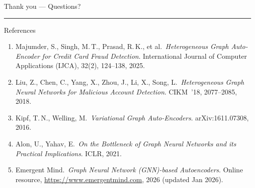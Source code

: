 \documentclass[10pt,aspectratio=169]{beamer}
\begin{document}
\begin{frame}[standout]
  \huge{Thank you --- Questions?}

  \vspace{0.8cm}
  \rule{\linewidth}{0.5pt}
  \vspace{0.8cm}

\end{frame}


\begin{frame}{References}
  \footnotesize
  \begin{enumerate}
    \item Majumder, S., Singh, M.\,T., Prasad, R.\,K., et al.\ \emph{Heterogeneous Graph Auto-Encoder for Credit Card Fraud Detection}. International Journal of Computer Applications (IJCA), 32(2), 124--138, 2025.
    \item Liu, Z., Chen, C., Yang, X., Zhou, J., Li, X., Song, L.\ \emph{Heterogeneous Graph Neural Networks for Malicious Account Detection}. CIKM~'18, 2077--2085, 2018.
    \item Kipf, T.\,N., Welling, M.\ \emph{Variational Graph Auto-Encoders}. arXiv:1611.07308, 2016.
    \item Alon, U., Yahav, E.\ \emph{On the Bottleneck of Graph Neural Networks and its Practical Implications}. ICLR, 2021.
    \item Emergent Mind.\ \emph{Graph Neural Network (GNN)-based Autoencoders}. Online resource, \url{https://www.emergentmind.com}, 2026 (updated Jan 2026).
  \end{enumerate}
\end{frame}
\end{document}
